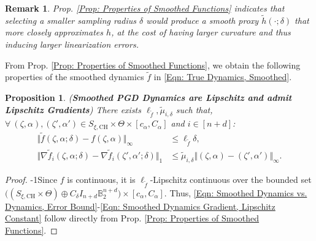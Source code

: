 \documentclass[letterpaper, 10 pt, conference]{ieeeconf}
\newcommand{\?}{\stackrel{?}{=}}
\newcommand{\paramDim}{d}
\newcommand{\paramSet}{\Theta}
\newcommand{\var}{\xi}
\newcommand{\varDim}{n}
\newcommand{\ballUnit}{\mathbb{B}}
\newcommand{\ratePGD}{\alpha}
\newcommand{\ratePGDMin}{c_\ratePGD}
\newcommand{\ratePGDMax}{C_\ratePGD}
\newcommand{\state}{\zeta}
\newcommand{\dynamicsFullState}{f}
\newcommand{\hessianBound}{\mu}
\newcommand{\hessianBoundSmoothed}{\tilde{\hessianBound}}
\newcommand{\varConvexHull}{S_{\var, \text{CH}}}
\newcommand{\samplingRadius}{\delta}
\newcommand{\samplingRadiusMax}{C_\samplingRadius}
\newcommand{\dynamicsFullStateSmoothed}{{\tilde{\dynamicsFullState}}}
\newcommand{\exampleFunction}{h}
\newcommand{\exampleFunctionSmoothed}{\tilde{\exampleFunction}}
\newcommand{\lipschitz}{\ell}
\newtheorem{remark}{Remark}
\newtheorem{proposition}{Proposition}
\begin{document}
\begin{remark}
Prop. \ref{Prop: Properties of Smoothed Functions} indicates that selecting a smaller sampling radius $\samplingRadius$ would produce a smooth proxy $\exampleFunctionSmoothed(\cdot; \samplingRadius)$ that more closely approximates $\exampleFunction$, at the cost of having larger curvature and thus inducing larger linearization errors.
\end{remark}

From Prop. \ref{Prop: Properties of Smoothed Functions}, we obtain the following properties of the smoothed dynamics $\dynamicsFullStateSmoothed$ in \eqref{Eqn: True Dynamics, Smoothed}.

\begin{proposition}
(\textbf{Smoothed PGD Dynamics are Lipschitz and admit Lipschitz Gradients})
\label{Prop: Properties of Smoothed Full Dynamics}
There exists $\lipschitz_\dynamicsFullStateSmoothed, \hessianBoundSmoothed_{i, \samplingRadius}$ such that, $\forall \ (\state, \ratePGD), (\state', \ratePGD') \in \varConvexHull \times \paramSet \times [\ratePGDMin, \ratePGDMax]$ and $i \in [\varDim + \paramDim]$:
{
\setlength{\abovedisplayskip}{3.5pt}
\setlength{\belowdisplayskip}{3.5pt}
\begin{align}
\label{Eqn: Smoothed Dynamics vs. Dynamics, Error Bound}
    \Vert \dynamicsFullStateSmoothed(\state, \ratePGD; \samplingRadius) - \dynamicsFullState(\state, \ratePGD) \Vert_\infty &\leq \lipschitz_\dynamicsFullStateSmoothed \samplingRadius, \\
\label{Eqn: Smoothed Dynamics Gradient, Lipschitz Constant}
    \Vert \nabla \dynamicsFullStateSmoothed_i(\state, \ratePGD; \samplingRadius) - \nabla \dynamicsFullStateSmoothed_i(\state', \ratePGD'; \samplingRadius) \Vert_1 &\leq \hessianBoundSmoothed_{i, \samplingRadius} \Vert (\state, \ratePGD) - (\state', \ratePGD') \Vert_\infty.
\end{align}
}
\end{proposition}

\begin{proof}
\looseness-1Since $\dynamicsFullState$ is continuous, it is $\lipschitz_{\dynamicsFullStateSmoothed}$-Lipschitz continuous over the bounded set $\big((\varConvexHull \times \paramSet) \oplus \samplingRadiusMax I_{\varDim + \paramDim} \ballUnit_2^{\varDim + \paramDim} \big) \times [\ratePGDMin, \ratePGDMax]$. Thus, \eqref{Eqn: Smoothed Dynamics vs. Dynamics, Error Bound}-\eqref{Eqn: Smoothed Dynamics Gradient, Lipschitz Constant} follow directly from Prop. \ref{Prop: Properties of Smoothed Functions}.
\end{proof}
\end{document}

